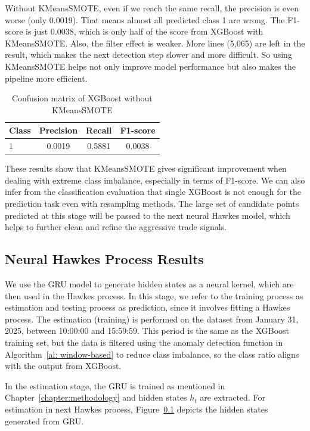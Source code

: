 Without KMeansSMOTE, even if we reach the same recall, the precision is even worse (only 0.0019). That means almost all predicted class 1 are wrong. The F1-score is just 0.0038, which is only half of the score from XGBoost with KMeansSMOTE. Also, the filter effect is weaker. More lines (5,065) are left in the result, which makes the next detection step slower and more difficult. So using KMeansSMOTE helps not only improve model performance but also makes the pipeline more efficient.

\begin{table}[H]
    \centering
    \caption{Confusion matrix of XGBoost without KMeansSMOTE}
    \label{tab:xgb-noKM}
    \begin{tabular}{lccc}
        \toprule
        Class & Precision & Recall & F1-score\\
        \midrule
        1 & 0.0019 & 0.5881 & 0.0038 \\        
        \bottomrule
    \end{tabular}
\end{table}

These results show that KMeansSMOTE gives significant improvement when dealing with extreme class imbalance, especially in terms of F1-score. We can also infer from the classification evaluation that single XGBoost is not enough for the prediction task even with resampling methods. The large set of candidate points predicted at this stage will be passed to the next neural Hawkes model, which helps to further clean and refine the aggressive trade signals. 

\newpage

\subsection{Neural Hawkes Process Results}
We use the GRU model to generate hidden states as a neural kernel, which are then used in the Hawkes process. In this stage, we refer to the training process as estimation and testing process as prediction, since it involves fitting a Hawkes process. The estimation (training) is performed on the dataset from January 31, 2025, between 10:00:00 and 15:59:59. This period is the same as the XGBoost training set, but the data is filtered using the anomaly detection function in Algorithm~\ref{al: window-based} to reduce class imbalance, so the class ratio aligns with the output from XGBoost.

In the estimation stage, the GRU is trained as mentioned in Chapter~\ref{chapter:methodology} and hidden states $h_t$ are extracted. For estimation in next Hawkes process, Figure~\ref{} depicts the hidden states generated from GRU.

